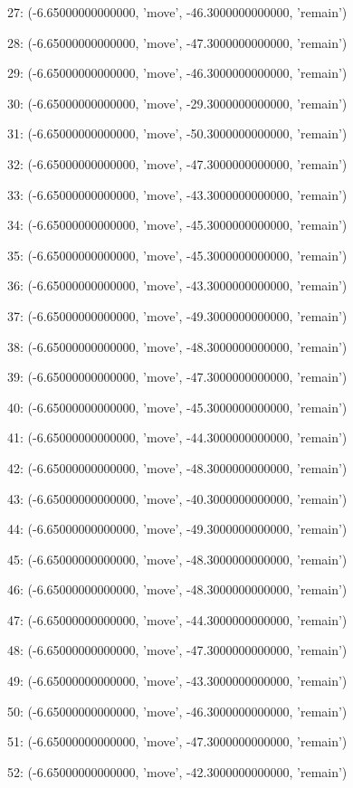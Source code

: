 27: (-6.65000000000000, 'move', -46.3000000000000, 'remain')


28: (-6.65000000000000, 'move', -47.3000000000000, 'remain')


29: (-6.65000000000000, 'move', -46.3000000000000, 'remain')


30: (-6.65000000000000, 'move', -29.3000000000000, 'remain')


31: (-6.65000000000000, 'move', -50.3000000000000, 'remain')


32: (-6.65000000000000, 'move', -47.3000000000000, 'remain')


33: (-6.65000000000000, 'move', -43.3000000000000, 'remain')


34: (-6.65000000000000, 'move', -45.3000000000000, 'remain')


35: (-6.65000000000000, 'move', -45.3000000000000, 'remain')


36: (-6.65000000000000, 'move', -43.3000000000000, 'remain')


37: (-6.65000000000000, 'move', -49.3000000000000, 'remain')


38: (-6.65000000000000, 'move', -48.3000000000000, 'remain')


39: (-6.65000000000000, 'move', -47.3000000000000, 'remain')


40: (-6.65000000000000, 'move', -45.3000000000000, 'remain')


41: (-6.65000000000000, 'move', -44.3000000000000, 'remain')


42: (-6.65000000000000, 'move', -48.3000000000000, 'remain')


43: (-6.65000000000000, 'move', -40.3000000000000, 'remain')


44: (-6.65000000000000, 'move', -49.3000000000000, 'remain')


45: (-6.65000000000000, 'move', -48.3000000000000, 'remain')


46: (-6.65000000000000, 'move', -48.3000000000000, 'remain')


47: (-6.65000000000000, 'move', -44.3000000000000, 'remain')


48: (-6.65000000000000, 'move', -47.3000000000000, 'remain')


49: (-6.65000000000000, 'move', -43.3000000000000, 'remain')


50: (-6.65000000000000, 'move', -46.3000000000000, 'remain')


51: (-6.65000000000000, 'move', -47.3000000000000, 'remain')


52: (-6.65000000000000, 'move', -42.3000000000000, 'remain')


